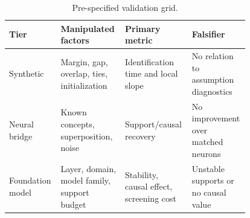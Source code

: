 \begin{table}[t]
\centering
\caption{Pre-specified validation grid.}
\label{tab:a-experiments}
\small
\begin{tabular}{p{0.16\linewidth}p{0.25\linewidth}p{0.23\linewidth}p{0.15\linewidth}}
\toprule
Tier & Manipulated factors & Primary metric & Falsifier \\
\midrule
Synthetic & Margin, gap, overlap, ties, initialization & Identification time and local slope & No relation to assumption diagnostics \\
Neural bridge & Known concepts, superposition, noise & Support/causal recovery & No improvement over matched neurons \\
Foundation model & Layer, domain, model family, support budget & Stability, causal effect, screening cost & Unstable supports or no causal value \\
\bottomrule
\end{tabular}
\end{table}

